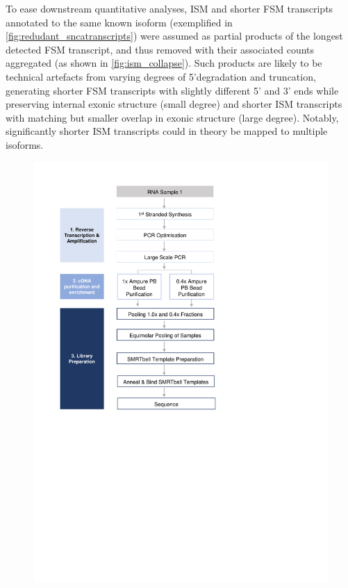 To ease downstream quantitative analyses, ISM and shorter FSM transcripts annotated to the same known isoform (exemplified in \cref{fig:redudant_sncatranscripts}) were assumed as partial products of the longest detected FSM transcript, and thus removed with their associated counts aggregated (as shown in \cref{fig:ism_collapse}). Such products are likely to be technical artefacts from varying degrees of 5'degradation and truncation, generating shorter FSM transcripts with slightly different 5' and 3' ends while preserving internal exonic structure (small degree) and shorter ISM transcripts with matching but smaller overlap in exonic structure (large degree). Notably, significantly shorter ISM transcripts could in theory be mapped to multiple isoforms.  

\begin{figure}[htp]
	\begin{center}
		\includegraphics[page=10,trim={0cm 0cm 0 0cm},clip, scale = 0.7]{Figures/ProjectDevelopment_Figures.pdf}

\end{center}
\end{figure}
